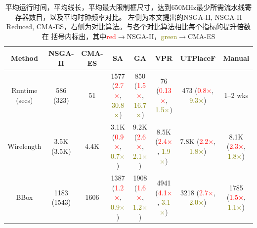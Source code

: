 \begin{table}[t]
    
    \caption{平均运行时间，平均线长，平均最大限制框尺寸，达到650MHz最少所需流水线寄存器数目，以及平均时钟频率对比。
    左侧为本文提出的NSGA-II, NSGA-II Reduced, CMA-ES，右侧为对比算法。与各个对比算法相比每个指标的提升倍数在
    括号内标出，其中\textcolor{red}{red}$\rightarrow$NSGA-II，\textcolor{olive}{green}$\rightarrow$CMA-ES}
	\label{table:comparison}
  \centering
  \begin{adjustbox}{width=1.1\textwidth,center}
  \begin{tabular}{c|c c| c c c c c}
	\toprule
  Method             & NSGA-II    	          & CMA-ES       & SA 					                                                                       & GA 			                                                                  & VPR     	                                                                & UTPlaceF 		                                                                   &  Manual \\
	\midrule
  Runtime (secs)     & 586 (323)		          & 51  		     &1577     (\textcolor{red}{2.7$\times$}, \textcolor{olive}{30.8$\times$})		        & 850 (\textcolor{red}{1.5$\times$}, \textcolor{olive}{16.7$\times$})		      & 76 (\textcolor{red}{0.13$\times$}, \textcolor{olive}{1.5$\times$})		    &  473 (\textcolor{red}{0.8$\times$}, \textcolor{olive}{9.3$\times$})            & 1--2 wks\\
  Wirelength  	     & 3.5K  (3.5K)   		    & 4.4K     		 &3.1K 	   (\textcolor{red}{0.9$\times$}, \textcolor{olive}{0.7$\times$})		          & 9.2K  (\textcolor{red}{2.6$\times$}, \textcolor{olive}{2.1$\times$})    		& 8.5K (\textcolor{red}{2.4$\times$}, \textcolor{olive}{1.9$\times$})   		&  7.8K  (\textcolor{red}{2.2$\times$}, \textcolor{olive}{1.8$\times$})          & 8.1K (\textcolor{red}{2.3$\times$}, \textcolor{olive}{1.8$\times$})  \\
  BBox      	       & 1183  (1543)   		    & 1606     		 &1387	   (\textcolor{red}{1.2$\times$}, \textcolor{olive}{0.9$\times$})		          & 1908  (\textcolor{red}{1.6$\times$}, \textcolor{olive}{1.2$\times$})   		  & 4941	(\textcolor{red}{4.1$\times$}, \textcolor{olive}{3.1$\times$})  		&   3218	(\textcolor{red}{2.7$\times$}, \textcolor{olive}{2.0$\times$})         & 1785 (\textcolor{red}{1.5$\times$}, \textcolor{olive}{1.1$\times$})  \\

\end{tabular}
\end{adjustbox}
\end{table}
